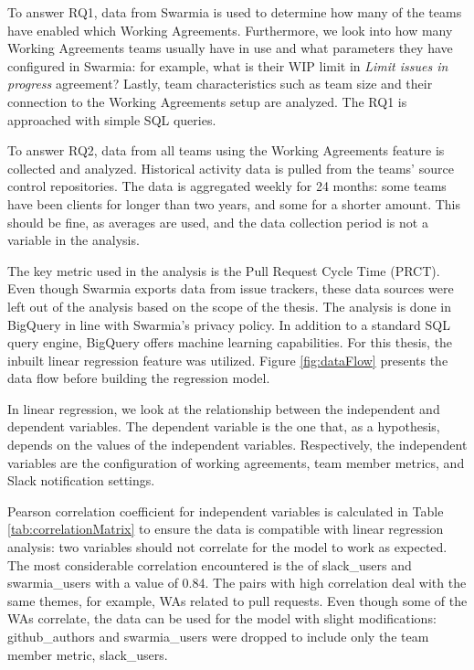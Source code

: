To answer RQ1, data from Swarmia is used to determine how many of the teams have enabled which Working Agreements. Furthermore, we look into how many Working Agreements teams usually have in use and what parameters they have configured in Swarmia: for example, what is their WIP limit in \textit{Limit issues in progress} agreement? Lastly, team characteristics such as team size and their connection to the Working Agreements setup are analyzed. The RQ1 is approached with simple SQL queries. 

To answer RQ2, data from all teams using the Working Agreements feature is collected and analyzed. Historical activity data is pulled from the teams' source control repositories. The data is aggregated weekly for 24 months: some teams have been clients for longer than two years, and some for a shorter amount. This should be fine, as averages are used, and the data collection period is not a variable in the analysis.

The key metric used in the analysis is the Pull Request Cycle Time (PRCT). Even though Swarmia exports data from issue trackers, these data sources were left out of the analysis based on the scope of the thesis. The analysis is done in BigQuery in line with Swarmia's privacy policy. In addition to a standard SQL query engine, BigQuery offers machine learning capabilities. For this thesis, the inbuilt linear regression feature was utilized. Figure \ref{fig:dataFlow} presents the data flow before building the regression model. 

In linear regression, we look at the relationship between the independent and dependent variables. The dependent variable is the one that, as a hypothesis, depends on the values of the independent variables. Respectively, the independent variables are the configuration of working agreements, team member metrics, and Slack notification settings. 



Pearson correlation coefficient for independent variables is calculated in Table \ref{tab:correlationMatrix} to ensure the data is compatible with linear regression analysis: two variables should not correlate for the model to work as expected. The most considerable correlation encountered is the of slack\_users and swarmia\_users with a value of 0.84. The pairs with high correlation deal with the same themes, for example, WAs related to pull requests. Even though some of the WAs correlate, the data can be used for the model with slight modifications: github\_authors and swarmia\_users were dropped to include only the team member metric, slack\_users. 

